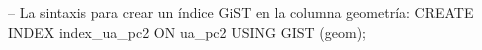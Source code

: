 \lstset{caption=Ejemplo de índice GiST,label=sql:gist}
\begin{SQL}
-- La sintaxis para crear un índice GiST en la columna geometría:
CREATE INDEX index_ua_pc2 ON ua_pc2 USING GIST (geom);
\end{SQL}
